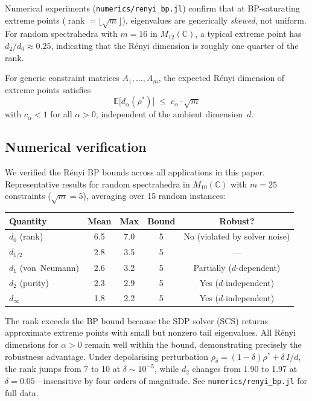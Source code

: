 \documentclass[11pt,a4paper]{article}
\theoremstyle{definition}
\begin{document}
Numerical experiments (\texttt{numerics/renyi\_bp.jl}) confirm that at
BP-saturating extreme points ($\operatorname{rank} = \lfloor\sqrt{m}\rfloor$),
eigenvalues are generically \emph{skewed}, not uniform.  For random
spectrahedra with $m = 16$ in $M_{12}(\mathbb{C})$, a typical extreme point
has $d_2/d_0 \approx 0.25$, indicating that the R\'enyi dimension is
roughly one quarter of the rank.

\begin{conjecture}
\label{conj:typical}
For generic constraint matrices $A_1,\ldots,A_m$, the expected R\'enyi
dimension of extreme points satisfies
\[
  \mathbb{E}\bigl[d_\alpha(\rho^*)\bigr] \;\leq\; c_\alpha \cdot \sqrt{m}
\]
with $c_\alpha < 1$ for all $\alpha > 0$, independent of the ambient
dimension~$d$.
\end{conjecture}

\subsection{Numerical verification}

We verified the R\'enyi BP bounds across all applications in this paper.
Representative results for random spectrahedra in $M_{10}(\mathbb{C})$ with
$m = 25$ constraints ($\sqrt{m} = 5$), averaging over 15 random instances:

\begin{center}
\renewcommand{\arraystretch}{1.2}
\begin{tabular}{lcccc}
\toprule
Quantity & Mean & Max & Bound & Robust? \\
\midrule
$d_0$ (rank) & 6.5 & 7.0 & 5 & No (violated by solver noise) \\
$d_{1/2}$ & 2.8 & 3.5 & 5 & --- \\
$d_1$ (von~Neumann) & 2.6 & 3.2 & 5 & Partially ($d$-dependent) \\
$d_2$ (purity) & 2.3 & 2.9 & 5 & Yes ($d$-independent) \\
$d_\infty$ & 1.8 & 2.2 & 5 & Yes ($d$-independent) \\
\bottomrule
\end{tabular}
\end{center}

The rank exceeds the BP bound because the SDP solver (SCS) returns approximate
extreme points with small but nonzero tail eigenvalues.  All R\'enyi dimensions
for $\alpha > 0$ remain well within the bound, demonstrating precisely the
robustness advantage.  Under depolarising perturbation
$\rho_\delta = (1{-}\delta)\rho^* + \delta\,I/d$, the rank jumps from 7 to 10
at $\delta \sim 10^{-5}$, while $d_2$ changes from 1.90 to 1.97 at
$\delta = 0.05$---insensitive by four orders of magnitude.
See \texttt{numerics/renyi\_bp.jl} for full data.
\end{document}
